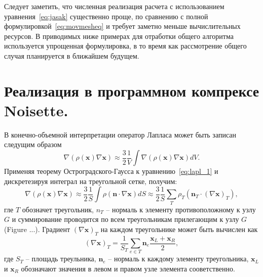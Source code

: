 Следует заметить, что численная реализация расчета с использованием уравнения~\eqref{eq:jasak} существенно проще, по сравнению с полной формулировкой~\eqref{eq:movmesheq} и требует заметно меньше вычислительных ресурсов. В приводимых ниже примерах для отработки общего алгоритма  используется упрощенная формулировка, в то время как рассмотрение общего случая планируется в ближайшем будущем.

\section{Реализация в программном компрексе Noisette.}

В конечно-объемной интерпретации оператор Лапласа может быть записан следущим образом
\begin{equation}
\nabla(\rho(\mathbf{x}) \nabla \mathbf{x})\approx \frac{3}{2}\frac{1}{V}\int \nabla(\rho(\mathbf{x}) \nabla \mathbf{x}) dV.
\label{eq:lapl_1}
\end{equation}
Применяя теорему Остроградского-Гаусса к уравнению~\eqref{eq:lapl_1} и дискретезируя интеграл на треугольной сетке, получим:
\begin{equation}
\nabla(\rho(\mathbf{x}) \nabla \mathbf{x})\approx \frac{3}{2}\frac{1}{S}\int \rho (\mathbf{n}\cdot \nabla \mathbf{x})dS
\approx \frac{3}{2}\frac{1}{S}\sum_{T} \rho_T (\mathbf{n}_T\cdot(\nabla \mathbf{x})_T) ,
\end{equation}
гле $T$ обозначет треугольник, $n_T$ -- нормаль к элементу противоположному к узлу $G$ и суммирование проводится по всем треугольникам прилегающим к узлу $G$ (Figure ...).
Градиент $(\nabla \mathbf{x})_T$ на каждом треугольнике может быть вычислен как 
\begin{equation}
(\nabla \mathbf{x})_T = \frac{1}{S_T}\sum_{e\in T}\mathbf{n}_e \frac{\mathbf{x}_L+\mathbf{x}_R}{2},
\label{eq:gradient}
\end{equation}
где $S_T$ -- площадь треульника, $\mathbf{n}_e$  -- нормаль к каждому элементу треугольника, $\mathbf{x}_L$ и $\mathbf{x}_R$ обозначают значения в левом и правом узле элемента сооветственно.

